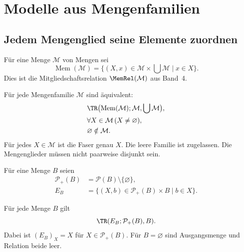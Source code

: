 \chapter{Modelle aus Mengenfamilien}
\label{b04guide:ch:models}

\section{Jedem Mengenglied seine Elemente zuordnen}

\begin{definition}
Für eine Menge $\mathcal M$ von Mengen sei
\[
 \operatorname{Mem}(\mathcal M)
 =\{(X,x)\in\mathcal M\times\bigcup\mathcal M\mid x\in X\}.
\]
Dies ist die Mitgliedschaftsrelation $\MemRel(\mathcal M)$
aus Band~4.
\end{definition}

\begin{theorem}
\label{b04guide:thm:membership}
Für jede Mengenfamilie $\mathcal M$ sind äquivalent:
\[
 \begin{aligned}
 &\TR\bigl(\operatorname{Mem}(\mathcal M);
                        \mathcal M,\bigcup\mathcal M\bigr),\\
 &\forall X\in\mathcal M\,(X\ne\varnothing),\\
 &\varnothing\notin\mathcal M.
 \end{aligned}
\]
Für jedes $X\in\mathcal M$ ist die Faser genau $X$.
Die leere Familie ist zugelassen. Die Mengenglieder müssen
nicht paarweise disjunkt sein.
\end{theorem}

\begin{definition}
Für eine Menge $B$ seien
\[
 \begin{aligned}
 \mathcal P_+(B)&=\mathcal P(B)\setminus\{\varnothing\},\\
 E_B&=\{(X,b)\in\mathcal P_+(B)\times B\mid b\in X\}.
 \end{aligned}
\]
\end{definition}

\begin{theorem}
\label{b04guide:thm:positive}
Für jede Menge $B$ gilt
\[
 \TR(E_B;\mathcal P_+(B),B).
\]
Dabei ist $(E_B)_X=X$ für $X\in\mathcal P_+(B)$.
Für $B=\varnothing$ sind Ausgangsmenge und Relation beide leer.
\end{theorem}

